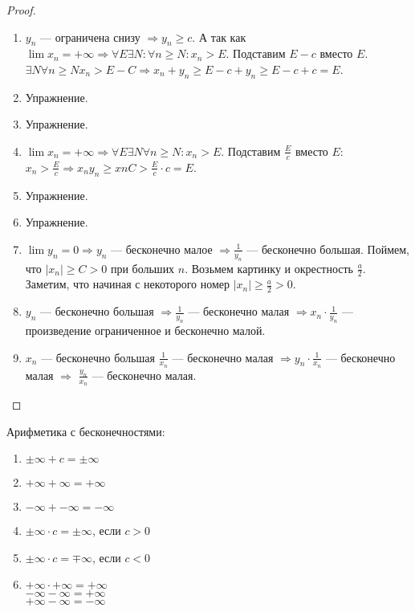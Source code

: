 \begin{proof}
    \slashn
    \begin{enumerate}
        \item $y_n$ --- ограничена снизу  $\Rightarrow y_n \ge c$. А так как $\lim x_n = +\infty \Rightarrow \forall E \exists N: \forall n \ge N: x_n > E$. Подставим $E-c$ вместо  $E$.  $\exists N \forall n \ge N x_n > E - C \Rightarrow x_n + y_n \ge E - c + y_n \ge E - c + c= E$.
        \item Упражнение.
        \item Упражнение.
        \item $\lim x_n = +\infty \Rightarrow \forall E \exists N \forall n \ge N: x_n > E$. Подставим $\frac{E}{c}$ вместо $E$:  $x_n > \frac{E}{c} \Rightarrow x_ny_n \ge xnC > \frac{E}{c}\cdot c = E$.
        \item Упражнение.
        \item Упражнение.
        \item $\lim y_n = 0 \Rightarrow y_n$ --- бесконечно малое $\Rightarrow \frac{1}{y_n}$ --- бесконечно большая. Поймем, что $|x_n| \ge C > 0$ при больших $n$. Возьмем картинку и окрестность  $\frac{a}{2}$. Заметим, что начиная с некоторого номер $|x_n| \ge \frac{a}{2} > 0$.
        \item $y_n $ --- бесконечно большая  $\Rightarrow \frac{1}{y_n}$ --- бесконечно малая $\Rightarrow x_n \cdot \frac{1}{y_n}$ --- произведение ограниченное и бесконечно малой.
        \item $x_n$ --- бесконечно большая  $\frac{1}{x_n}$ --- бесконечно малая $\Rightarrow y_n \cdot \frac{1}{x_n}$ --- бесконечно малая $\Rightarrow$  $\frac{y_n}{x_n}$ --- бесконечно малая.
    \end{enumerate}
\end{proof}
\slashn Арифметика с бесконечностями:
\begin{enumerate}
    \item $\pm \infty + c = \pm \infty$ 
    \item $+\infty + \infty = +\infty$
    \item  $-\infty + -\infty = -\infty$
    \item  $\pm \infty \cdot c = \pm \infty$, если  $c>0$
    \item  $\pm \infty \cdot c = \mp \infty$, если $c<0$
    \item  $+\infty\cdot+\infty = +\infty$\\
        $-\infty-\infty=+\infty$\\
        $+\infty-\infty = -\infty$
\end{enumerate}
